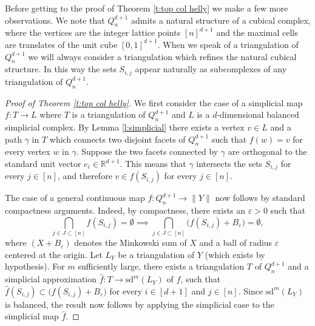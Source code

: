 \documentclass[12pt,a4paper,oneside]{amsart}\sloppy
\theoremstyle{definition}
\newcommand{\cubical}[2]{Q_{#1}^{#2}}
\newcommand{\slice}[2]{S_{#1,#2} }
\begin{document}
Before getting to the proof of Theorem \ref{t:top col helly} we make a few more observations. We note that $\cubical{n}{d+1}$ admits a natural structure of a cubical complex, where the vertices are the integer lattice points $[n]^{d+1}$ and the maximal cells are translates of the unit cube $[0,1]^{d+1}$. When we speak of a triangulation of $\cubical{n}{d+1}$ we will always consider a triangulation which refines the natural cubical structure. In this way the sets $\slice{i}{j}$ appear naturally as subcomplexes of any triangulation of $\cubical{n}{d+1}$.

\begin{proof}[Proof of Theorem \ref{t:top col helly}]
We first consider the case of a simplicial map $f \colon T \to L$ where $T$ is a triangulation of $\cubical{n}{d+1}$ and $L$ is a $d$-dimensional balanced simplicial complex.  By Lemma \ref{l:simplicial} there exists a vertex $v\in L$ and a path $\gamma$ in $T$ which connects two disjoint facets of $\cubical{n}{d+1}$ such that $f(w) = v$ for every vertex $w$ in $\gamma$. Suppose the two facets connected by $\gamma$ are orthogonal to the standard unit vector $e_i \in \mathbb{R}^{d+1}$. This means that $\gamma$ intersects the sets $\slice{i}{j}$ for every $j\in [n]$, and therefore $v\in f(\slice{i}{j})$ for every $j\in [n]$.

The case of a general continuous map $f \colon \cubical{n}{d+1} \to \|Y\|$ now follows by standard compactness arguments. Indeed, by compactness, there exists an $\varepsilon > 0$ such that 
\[\bigcap_{j\in J\subset [n]}f(\slice{i}{j}) = \emptyset \implies \bigcap_{j\in J\subset [n]} \big( f(\slice{i}{j})+B_\varepsilon\big) = \emptyset,\] where $(X+B_\varepsilon)$ denotes the Minkowski sum of $X$ and a ball of radius $\varepsilon$ centered at the origin. Let $L_Y$ be a triangulation of $Y$ (which exists by hypothesis). For $m$ sufficiently large, there exists a triangulation $T$ of $\cubical{n}{d+1}$ and a simplicial approximation $\hat{f} \colon T \to \text{sd}^m(L_Y)$ of $f$, such that $\hat{f}(\slice{i}{j}) \subset \big( f(\slice{i}{j}) + B_\varepsilon \big)$ for every $i\in [d+1]$ and $j\in [n]$. Since $\text{sd}^m(L_Y)$ is balanced, the result now follows by applying the simplicial case to the simplicial map $\hat{f}$. 
\end{proof}
\end{document}
